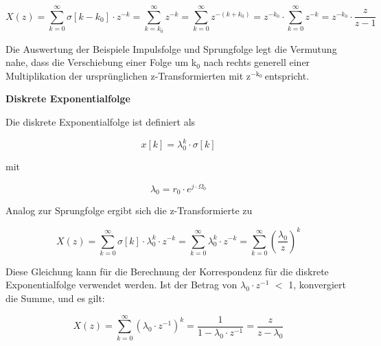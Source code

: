 \begin{equation}\label{eq:fivetwentyone}
X\left(z\right)=\sum _{k=0}^{\infty }\sigma \left[k-k_{0} \right]\cdot z^{-k}  =\sum _{k=k_{0} }^{\infty }z^{-k}  =\sum _{k=0}^{\infty }z^{-(k+k_{0} )}  =z^{-k_{0} } \cdot \sum _{k=0}^{\infty }z^{-k}  =z^{-k_{0} } \cdot \frac{z}{z-1}
\end{equation}

\noindent Die Auswertung der Beispiele Impulsfolge und Sprungfolge legt die Vermutung nahe, dass die Verschiebung einer Folge um k${}_{0}$ nach rechts generell einer Multiplikation der urspr\"{u}nglichen z-Transformierten mit ${\mathrm{z}}^{\mathrm{-}{\mathrm{k}}_0}\ $entspricht.\bigskip

{\selectfont
\noindent\textbf{Diskrete Exponentialfolge}}\smallskip

\noindent Die diskrete Exponentialfolge ist definiert als 

\begin{equation}\label{eq:fivetwentytwo}
x\left[k\right]=\lambda _{0}^{k} \cdot \sigma \left[k\right]
\end{equation}

\noindent mit

\begin{equation}\label{eq:fivetwentythree}
\lambda _{0} =r_{0} \cdot e^{j\cdot \Omega _{0} }
\end{equation}

\noindent Analog zur Sprungfolge ergibt sich die z-Transformierte zu

\begin{equation}\label{eq:fivetwentyfour}
X\left(z\right)=\sum _{k=0}^{\infty }\sigma \left[k\right]\cdot \lambda _{0}^{k} \cdot z^{-k}  =\sum _{k=0}^{\infty }\lambda _{0}^{k} \cdot z^{-k}  =\sum _{k=0}^{\infty }\left(\frac{\lambda _{0} }{z} \right)^{k} 
\end{equation}

\noindent Diese Gleichung kann f\"{u}r die Berechnung der Korrespondenz f\"{u}r die diskrete Exponentialfolge verwendet werden. Ist der Betrag von {\textbar}$\lambda_{0}\cdot z{}^{-1}${\textbar} $\mathrm{<}$ 1, konvergiert die Summe, und es gilt:

\begin{equation}\label{eq:fivetwentyfive}
X\left(z\right)=\sum _{k=0}^{\infty }\left(\lambda _{0} \cdot z^{-1} \right)^{k}  =\frac{1}{1-\lambda _{0} \cdot z^{-1} } =\frac{z}{z-\lambda _{0} }
\end{equation}


